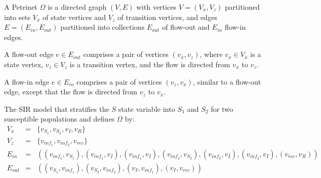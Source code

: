 \begin{definition}
    A Petrinet $\Omega$ is a directed graph $(V, E)$ with vertices $V=(V_x,
    V_z)$ partitioned into sets $V_x$ of state vertices and $V_z$ of transition
    vertices, and edges $E=(E_{in}, E_{out})$ partitioned into collections $E_{out}$ of
    flow-out and $E_{in}$ flow-in edges. 
\end{definition}



\begin{definition}
A flow-out edge $e \in E_{out}$ comprises a pair of vertices $(v_x,v_z)$, where
$v_x \in V_x$ is a state vertex, $v_z \in V_z$ is a transition vertex, and the
flow is directed from $v_x$ to $v_z$.  
\end{definition}

\begin{definition}
    A flow-in edge $e \in E_{in}$ comprises a pair of vertices $(v_z,v_x)$,
    similar to a flow-out edge, except that the flow is directed from $v_z$ to
    $v_x$.  
\end{definition}

\begin{example}
    The SIR model that stratifies the $S$ state variable into $S_1$ and $S_2$
    for two susceptible populations and defines $\Omega$ by:
    \begin{eqnarray*}
        V_x &=& \{v_{S_1}, v_{S_2}, v_{I}, v_{R}\}\\
        V_z &=& \{v_{inf_1}, v_{inf_2}, v_{rec}\}\\
        E_{in} &=& ((v_{inf_1}, v_{S_1}), (v_{inf_1}, v_{I}), (v_{inf_1}, v_{I}), (v_{inf_2}, v_{S_2}), (v_{inf_2}, v_{I}),
        (v_{inf_2}, v_{I}), (v_{rec}, v_{R}))\\
        E_{out} &=& ((v_{S_1}, v_{inf_1}), (v_{S_2}, v_{inf_2}),(v_{I}, v_{inf_1}), (v_{I}, v_{rec}))
    \end{eqnarray*}
\end{example}

